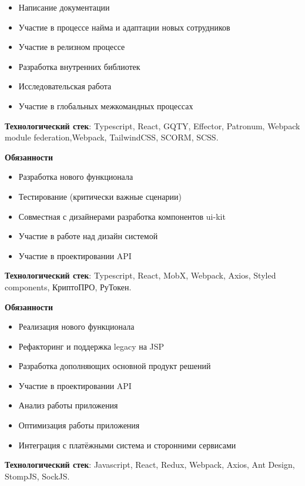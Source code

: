 \documentclass[10pt,a4paper,ragged2e,withhyper]{altacv}
\begin{document}
\begin{paracol}{2}
\begin{itemize}
                \item Написание документации
                \item Участие в процессе найма и адаптации новых сотрудников
                \item Участие в релизном процессе
                \item Разработка внутренних библиотек
                \item Исследовательская работа
                \item Участие в глобальных межкомандных процессах
            \end{itemize}
            \textbf{Технологический стек}: Typescript, React, GQTY, Effector, Patronum, Webpack module federation,Webpack, TailwindCSS, SCORM, SCSS.


            \divider
            \textbf{Обязанности}
            \begin{itemize}
                \item Разработка нового функционала
                \item Тестирование (критически важные сценарии)
                \item Совместная с дизайнерами разработка компонентов ui-kit
                \item Участие в работе над дизайн системой
                \item Участие в проектировании API
            \end{itemize}
            \textbf{Технологический стек}: Typescript, React, MobX, Webpack, Axios, Styled components, КриптоПРО, РуТокен.


            \divider
            \textbf{Обязанности}
            \begin{itemize}
                \item Реализация нового функционала
                \item Рефакторинг и поддержка legacy  на JSP
                \item Разработка  дополняющих основной продукт решений
                \item Участие в проектировании API
                \item Анализ работы приложения
                \item Оптимизация работы приложения
                \item Интеграция с платёжными система и сторонними сервисами
            \end{itemize}
            \textbf{Технологический стек}: Javascript, React, Redux, Webpack, Axios, Ant Design, StompJS, SockJS.



\end{paracol}
\end{document}
